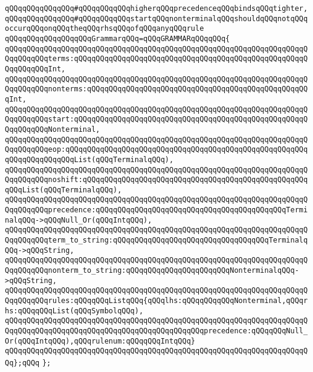 \verb|qQQqqQQqqQQqqQQq#qQQqqQQqqQQqhigherqQQqprecedenceqQQqbindsqQQqtighter,|\newline
\verb|qQQqqQQqqQQqqQQq#qQQqqQQqqQQqstartqQQqnonterminalqQQqshouldqQQqnotqQQqoccurqQQqonqQQqtheqQQqrhsqQQqofqQQqanyqQQqrule|\newline
\newline
\newline
\verb|qQQqqQQqqQQqqQQqqQQqGrammarqQQq=qQQqGRAMMARqQQqqQQq{|\newline
\verb|qQQqqQQqqQQqqQQqqQQqqQQqqQQqqQQqqQQqqQQqqQQqqQQqqQQqqQQqqQQqqQQqqQQqqQQqqQQqqQQqterms:qQQqqQQqqQQqqQQqqQQqqQQqqQQqqQQqqQQqqQQqqQQqqQQqqQQqqQQqqQQqqQQqInt,|\newline
\verb|qQQqqQQqqQQqqQQqqQQqqQQqqQQqqQQqqQQqqQQqqQQqqQQqqQQqqQQqqQQqqQQqqQQqqQQqqQQqqQQqnonterms:qQQqqQQqqQQqqQQqqQQqqQQqqQQqqQQqqQQqqQQqqQQqqQQqqQQqInt,|\newline
\verb|qQQqqQQqqQQqqQQqqQQqqQQqqQQqqQQqqQQqqQQqqQQqqQQqqQQqqQQqqQQqqQQqqQQqqQQqqQQqqQQqstart:qQQqqQQqqQQqqQQqqQQqqQQqqQQqqQQqqQQqqQQqqQQqqQQqqQQqqQQqqQQqqQQqNonterminal,|\newline
\verb|qQQqqQQqqQQqqQQqqQQqqQQqqQQqqQQqqQQqqQQqqQQqqQQqqQQqqQQqqQQqqQQqqQQqqQQqqQQqqQQqeop:qQQqqQQqqQQqqQQqqQQqqQQqqQQqqQQqqQQqqQQqqQQqqQQqqQQqqQQqqQQqqQQqqQQqqQQqList(qQQqTerminalqQQq),|\newline
\verb|qQQqqQQqqQQqqQQqqQQqqQQqqQQqqQQqqQQqqQQqqQQqqQQqqQQqqQQqqQQqqQQqqQQqqQQqqQQqqQQqnoshift:qQQqqQQqqQQqqQQqqQQqqQQqqQQqqQQqqQQqqQQqqQQqqQQqqQQqqQQqList(qQQqTerminalqQQq),|\newline
\verb|qQQqqQQqqQQqqQQqqQQqqQQqqQQqqQQqqQQqqQQqqQQqqQQqqQQqqQQqqQQqqQQqqQQqqQQqqQQqqQQqprecedence:qQQqqQQqqQQqqQQqqQQqqQQqqQQqqQQqqQQqqQQqqQQqTerminalqQQq->qQQqNull_Or(qQQqIntqQQq),|\newline
\verb|qQQqqQQqqQQqqQQqqQQqqQQqqQQqqQQqqQQqqQQqqQQqqQQqqQQqqQQqqQQqqQQqqQQqqQQqqQQqqQQqterm_to_string:qQQqqQQqqQQqqQQqqQQqqQQqqQQqqQQqqQQqTerminalqQQq->qQQqString,|\newline
\verb|qQQqqQQqqQQqqQQqqQQqqQQqqQQqqQQqqQQqqQQqqQQqqQQqqQQqqQQqqQQqqQQqqQQqqQQqqQQqqQQqnonterm_to_string:qQQqqQQqqQQqqQQqqQQqqQQqNonterminalqQQq->qQQqString,|\newline
\verb|qQQqqQQqqQQqqQQqqQQqqQQqqQQqqQQqqQQqqQQqqQQqqQQqqQQqqQQqqQQqqQQqqQQqqQQqqQQqqQQqrules:qQQqqQQqListqQQq{qQQqlhs:qQQqqQQqqQQqNonterminal,qQQqrhs:qQQqqQQqList(qQQqSymbolqQQq),|\newline
\verb|qQQqqQQqqQQqqQQqqQQqqQQqqQQqqQQqqQQqqQQqqQQqqQQqqQQqqQQqqQQqqQQqqQQqqQQqqQQqqQQqqQQqqQQqqQQqqQQqqQQqqQQqqQQqqQQqqQQqprecedence:qQQqqQQqNull_Or(qQQqIntqQQq),qQQqrulenum:qQQqqQQqIntqQQq}|\newline
\verb|qQQqqQQqqQQqqQQqqQQqqQQqqQQqqQQqqQQqqQQqqQQqqQQqqQQqqQQqqQQqqQQqqQQqqQQq};qQQq|\newline
\verb|};|\newline
\newline

